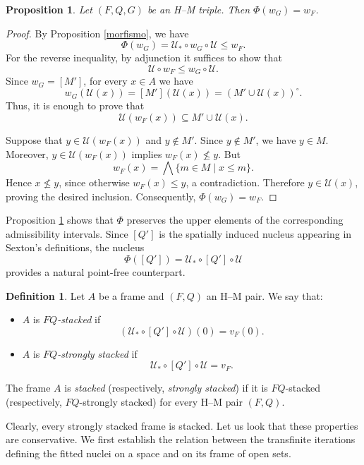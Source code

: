 \documentclass[11pt]{amsart}
\theoremstyle{plain}
\newtheorem{prop}[thm]{Proposition}
\theoremstyle{definition}
\newtheorem{dfn}[thm]{Definition}
\begin{document}
\begin{prop}\label{igualdadwF}
Let \((F,Q,G)\) be an H--M triple. Then \(\Phi(w_G)=w_F\).
\end{prop}


\begin{proof}
By Proposition \ref{morfismo}, we have
\[
\Phi(w_G)=\mathcal U_*\circ w_G\circ\mathcal U\leq w_F.
\]
For the reverse inequality, by adjunction it suffices
to show that
\[
\mathcal U\circ w_F\leq w_G\circ\mathcal U.
\]
Since $w_G=[M']$, for every $x\in A$ we have
\[
w_G(\mathcal{U}(x))=[M'](\mathcal{U}(x))=(M'\cup \mathcal{U}(x))^\circ.
\]
Thus, it is enough to prove that
\[
\mathcal{U}(w_F(x))\subseteq M'\cup \mathcal{U}(x).
\]

Suppose that $y\in \mathcal{U}(w_F(x))$ and $y\notin M'$.
Since $y\notin M'$, we have $y\in M$. Moreover,
$y\in \mathcal{U}(w_F(x))$ implies $w_F(x)\nleq y$.
But
\[
w_F(x)=\bigwedge\{m\in M\mid x\leq m\}.
\]
Hence $x\nleq y$, since otherwise
$w_F(x)\leq y$, a contradiction. Therefore
$y\in \mathcal{U}(x)$, proving the desired inclusion.
Consequently, $\Phi(w_G)=w_F$.
\end{proof}


Proposition \ref{igualdadwF} shows that $\Phi$ preserves the upper elements
of the corresponding admissibility intervals.
Since $[Q']$ is the spatially induced nucleus appearing
in Sexton's definitions, the nucleus
\[
\Phi([Q'])=\mathcal{U}_*\circ[Q']\circ \mathcal{U}
\]
provides a natural point-free counterpart. 

\begin{dfn}\label{def:apilado-marcos}
Let $A$ be a frame and $(F,Q)$ an H--M pair.
We say that:
\begin{itemize}
    \item $A$ is \emph{$FQ$-stacked} if
    \[
    (\mathcal{U}_*\circ[Q']\circ \mathcal{U})(0)=v_F(0).
    \]

    \item $A$ is \emph{$FQ$-strongly stacked} if
    \[
    \mathcal{U}_*\circ[Q']\circ \mathcal{U}=v_F.
    \]
\end{itemize}
The frame $A$ is \emph{stacked} (respectively,
\emph{strongly stacked}) if it is $FQ$-stacked
(respectively, $FQ$-strongly stacked) for every
H--M pair $(F,Q)$.
\end{dfn}

Clearly, every strongly stacked frame is stacked. Let us look that these properties are conservative. 
We first establish the relation between the transfinite iterations defining the fitted nuclei on a space and
on its frame of open sets.
\end{document}
